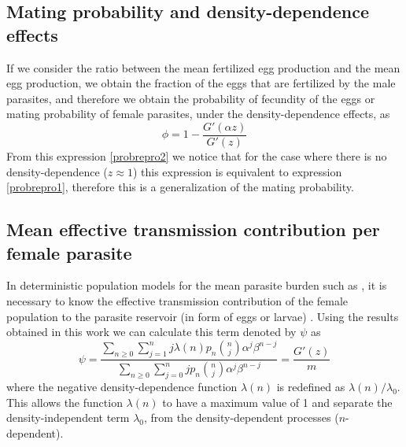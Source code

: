 \documentclass[12pt,a4paper]{article}
\theoremstyle{plain}%
\theoremstyle{definition}
\theoremstyle{remark}
\begin{document}
	\subsection{Mating probability and density-dependence effects}
	
If we consider the ratio between the mean fertilized egg production and the mean egg production,  we obtain the fraction of the eggs that are fertilized by the male parasites,
	and therefore we obtain the probability of fecundity of the eggs or mating probability of female parasites, under the density-dependence effects, as
	\begin{equation}\label{probrepro2}
	\phi=1-\frac{G'(\alpha z)}{G'(z)} 
	\end{equation}
	From this expression \eqref{probrepro2} we notice that for the case where there is no density-dependence ($z \approx 1$) this expression is equivalent to expression \eqref{probrepro1}, therefore this is a generalization of the mating probability.
	
	
	\subsection{Mean effective transmission contribution per female parasite}
	In deterministic population models  for the  mean parasite burden such as \cite{anderson1985helminth,anderson1992infectious,truscott2014modeling}, 
	it is necessary to know the effective transmission contribution of the  female population to the parasite reservoir (in form of eggs or larvae)  \cite{churcher2005density,churcher2006density}.
	Using the results obtained in this work we can calculate this term denoted by $\psi$ as
	\begin{equation}\label{psi}
	\psi=\frac{\sum_{n\geq 0}\sum_{j=1}^{n}j\lambda(n)p_n\binom{n}{j}\alpha^j\beta^{n-j}}
	{\sum_{n\geq 0}\sum_{j=0}^{n}jp_n\binom{n}{j}\alpha^j\beta^{n-j}}
	=\frac{G'(z)}{m}   
	\end{equation}
	where the negative density-dependence function $\lambda(n)$ is redefined as $\lambda(n)/\lambda_0$.
	This allows the function $\lambda(n)$ to have a maximum value of 1
	and separate the density-independent term $\lambda_0$, from the density-dependent processes ($n$-dependent).
	
	
	
\end{document}
